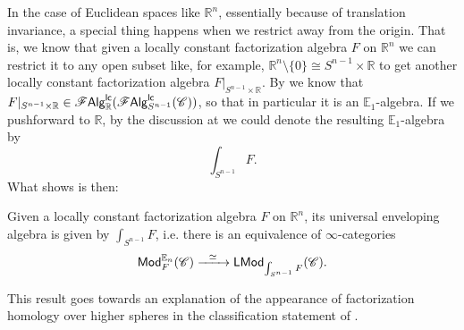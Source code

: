 \documentclass[../text.tex]{subfiles}
\begin{document}
\begin{remark}
    In the case of Euclidean spaces like $\mathbb{R}^n$, essentially because of translation invariance, a special thing happens when we restrict away from the origin. That is, we know that given a locally constant factorization algebra $F$ on $\mathbb{R}^n$ we can restrict it to any open subset like, for example, $\mathbb{R}^n \setminus \{ 0 \} \cong S^{n-1} \times \mathbb{R}$ to get another locally constant factorization algebra $F|_{S^{n-1} \times \mathbb{R}}$. By  we know that $F|_{S^{n-1} \times \mathbb{R}} \in \mathscr{F} \mathsf{Alg}^{\mathsf{lc}}_{\mathbb{R}} (\mathscr{F} \mathsf{Alg}^{\mathsf{lc}}_{S^{n-1}} (\mathscr{C}))$, so that in particular it is an $\mathbb{E}_1$-algebra. If we pushforward to $\mathbb{R}$, by the discussion at  we could denote the resulting $\mathbb{E}_1$-algebra by
    \begin{equation}
        \int_{S^{n-1}} F.
    \end{equation}
    What \cite[prop.3.16]{francis2013} shows is then:

    \begin{proposition}\label{univ_env_for_En}
        Given a locally constant factorization algebra $F$ on $\mathbb{R}^n$, its universal enveloping algebra is given by $\int_{S^{n-1}} F$, i.e. there is an equivalence of $\infty$-categories
        \begin{equation}
            \mathsf{Mod}^{\mathbb{E}_n}_{F} (\mathscr{C}) \xrightarrow{\ \ \simeq \ \ } \mathsf{LMod}_{\int_{S^{n-1}} F} (\mathscr{C}).
        \end{equation}
    \end{proposition}
    This result goes towards an explanation of the appearance of factorization homology over higher spheres in the classification statement of .
\end{remark}
\end{document}
